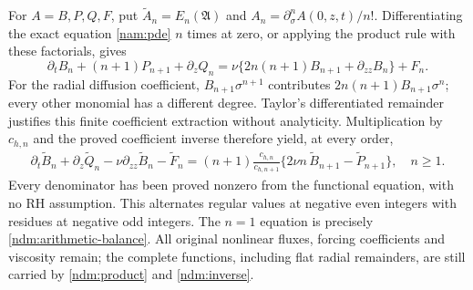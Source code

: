 For \(A=B,P,Q,F\), put
\(\widetilde A_n=E_n(\mathfrak A)\) and
\(A_n=\partial_\sigma^n A(0,z,t)/n!\).
Differentiating the exact equation \eqref{nam:pde} \(n\) times at
zero, or applying the product rule with these factorials, gives
\[
 \partial_tB_n+(n+1)P_{n+1}+\partial_zQ_n
 =\nu\{2n(n+1)B_{n+1}+\partial_{zz}B_n\}+F_n .
\]
For the radial diffusion coefficient, \(B_{n+1}\sigma^{n+1}\)
contributes \(2n(n+1)B_{n+1}\sigma^n\); every other monomial has
a different degree. Taylor's differentiated remainder justifies
this finite coefficient extraction without analyticity.
Multiplication by \(c_{h,n}\) and the proved coefficient inverse
therefore yield, at every order,
\begin{equation}\label{ndm:full-hierarchy}
 \begin{split}
 \partial_t\widetilde B_n+\partial_z\widetilde Q_n
       -\nu\partial_{zz}\widetilde B_n-\widetilde F_n
 = (n+1)\frac{c_{h,n}}{c_{h,n+1}}
             \{2\nu n\,\widetilde B_{n+1}
                             -\widetilde P_{n+1}\},\quad n\ge1 .
 \end{split}
\end{equation}
Every denominator has been proved nonzero from the functional
equation, with no RH assumption. This alternates regular values
at negative even integers with residues at negative odd integers.
The \(n=1\) equation is precisely \eqref{ndm:arithmetic-balance}.
All original nonlinear fluxes, forcing coefficients and viscosity
remain; the complete functions, including flat radial remainders,
are still carried by \eqref{ndm:product} and \eqref{ndm:inverse}.
